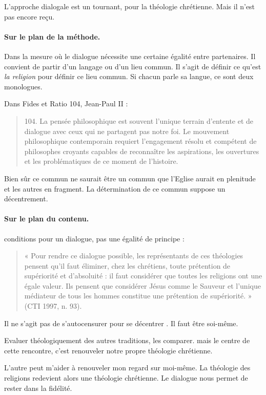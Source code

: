 L'approche dialogale est un tournant, pour la théologie chrétienne. Mais il n'est pas encore reçu.


\paragraph{Sur le plan de la méthode.  } 
 Dans la mesure où le dialogue nécessite une certaine égalité entre partenaires.  Il convient de partir d'un langage ou d'un lieu commun. Il s'agit de définir ce qu'est \textit{la religion} pour définir ce lieu commun. Si chacun parle sa langue, ce sont deux monologues.
 
 Dans Fides et Ratio 104, Jean-Paul II :
 \begin{quote}
     104. La pensée philosophique est souvent l'unique terrain d'entente et de dialogue avec ceux qui ne partagent pas notre foi. Le mouvement philosophique contemporain requiert l'engagement résolu et compétent de philosophes croyants capables de reconnaître les aspirations, les ouvertures et les problématiques de ce moment de l'histoire. 
 \end{quote}

Bien sûr ce commun ne saurait être un commun que l'Eglise aurait en plenitude et les autres en fragment. La détermination de ce commun suppose un décentrement.


\paragraph{Sur le plan du contenu.  } 


conditions pour un dialogue, pas une égalité de principe :  

\begin{quote}
    « Pour rendre ce dialogue possible, les représentants de ces théologies pensent qu’il faut éliminer, chez les chrétiens, toute prétention de supériorité et d’absoluité : il faut considérer que toutes les religions ont une égale valeur. Ils pensent que considérer Jésus comme le Sauveur et l’unique médiateur de tous les hommes constitue une prétention de supériorité. » (CTI 1997, n. 93).   
\end{quote}
Il ne s'agit pas de s'autocensurer pour se décentrer . Il faut être soi-même. 




Evaluer théologiquement des autres traditions, les comparer. mais le centre de cette rencontre, c'est renouveler notre propre théologie chrétienne. 

L'autre peut m'aider à renouveler mon regard sur moi-même. La théologie des religions redevient alors une théologie chrétienne. Le dialogue nous permet de rester dans la fidélité.

